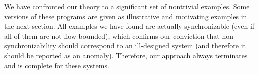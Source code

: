 We have confronted our theory to a significant set of nontrivial examples. Some versions of these programs are given as illustrative and motivating examples in the next section. 
All examples we have found are actually synchronizable (even if all of them are not flow-bounded), which confirms our conviction that non-synchronizability should correspond to an ill-designed system (and therefore it should be reported as an anomaly). Therefore, our approach always terminates and is complete for these systems.


%
%
%
%
%
%
